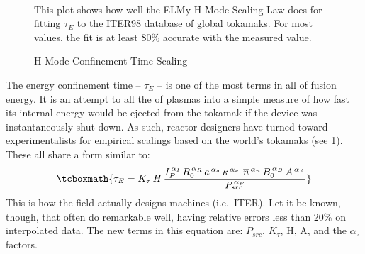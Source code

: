 \begin{figure}
	\centering
	\begin{adjustbox}{width=0.75\textwidth}
		
	\end{adjustbox}
	\caption{H-Mode Confinement Time Scaling} ~\\
	\small This plot shows how well the ELMy H-Mode Scaling Law does for fitting $\tau_E$ to the ITER98 database of global tokamaks. For most values, the fit is at least 80\% accurate with the measured value.\cite{tau_iter}
	\label{fig:elmy}
\end{figure}

The energy confinement time -- $\tau_E$ -- is one of the most  terms in all of fusion energy. It is an attempt to  all the  of plasmas into a simple measure of how fast its internal energy would be ejected from the tokamak if the device was instantaneously shut down. As such, reactor designers have turned toward experimentalists for empirical scalings based on the world's tokamaks (see \cref{fig:elmy}). These all share a form similar to:
\begin{equation}
	\tcboxmath{
	\tau_E = K_\tau \, H \, \frac{
		I_P^{\,\alpha_I} \, R_0^{\,\alpha_R} \, a^{\,\alpha_a} \, \kappa^{\,\alpha_\kappa} \ \overline{n}^{\,\alpha_n} \, B_0^{\,\alpha_B} \, A^{\,\alpha_A}
	}{ P_{src} ^ {\,\alpha_P} }
	}
	\label{eq:tau_gen}
\end{equation}
This  is how the field actually designs machines (i.e.\ ITER). Let it be known, though, that  often do remarkable well, having relative errors less than 20\% on interpolated data. The new terms in this equation are: $P_{src}$, $K_\tau$, H, A, and the $\alpha_{\,\square}$ factors.

